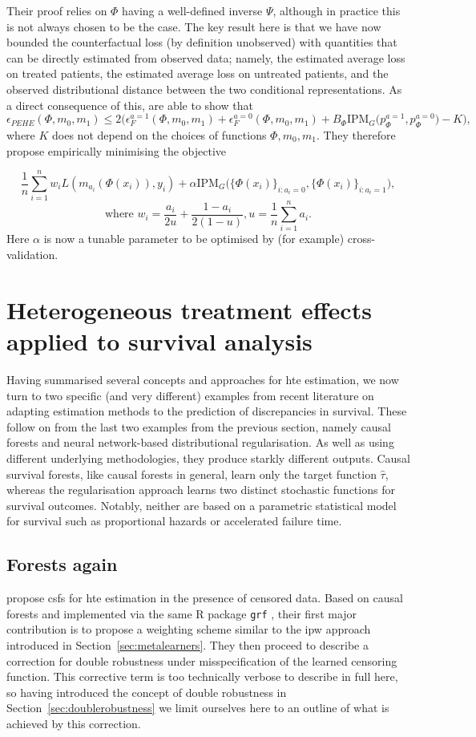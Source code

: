 \documentclass[../thesis.tex]{subfiles}
\begin{document}
Their proof relies on $\Phi$ having a well-defined inverse $\Psi$, although in practice this is not always chosen to be the case. The key result here is that we have now bounded the counterfactual loss (by definition unobserved) with quantities that can be directly estimated from observed data; namely, the estimated average loss on treated patients, the estimated average loss on untreated patients, and the observed distributional distance between the two conditional representations. As a direct consequence of this, \citet{shalit_estimating_2017} are able to show that 
\[ \epsilon_{PEHE}(\Phi, m_0, m_1) \leq 2\Big(\epsilon_{F}^{a=1}(\Phi, m_0, m_1) + \epsilon^{a=0}_F(\Phi, m_0, m_1) + B_{\Phi}\mathrm{IPM}_G\big(p_\Phi^{a=1}, p_\Phi^{a=0}\big) - K\Big),\]
where $K$ does not depend on the choices of functions $\Phi, m_0, m_1$. They therefore propose empirically minimising the objective

\[\frac{1}{n}\sum_{i=1}^n w_i L(m_{a_i}(\Phi(x_i)), y_i) + \alpha \mathrm{IPM}_G\big(\{\Phi(x_i)\}_{i:a_i=0}, \{\Phi(x_i)\}_{i:a_i=1}\big),\]
\[ \text{where } w_i = \frac{a_i}{2u} + \frac{1-a_i}{2(1-u)}, u = \frac{1}{n}\sum_{i=1}^{n}a_i.\]
Here $\alpha$ is now a tunable parameter to be optimised by (for example) cross-validation.


\section{Heterogeneous treatment effects applied to survival analysis \label{sec:hte_survival}}
Having summarised several concepts and approaches for \gls{hte} estimation, we now turn to two specific (and very different) examples from recent literature on adapting estimation methods to the prediction of discrepancies in survival. These follow on from the last two examples from the previous section, namely causal forests and neural network-based distributional regularisation. As well as using different underlying methodologies, they produce starkly different outputs. Causal survival forests, like causal forests in general, learn only the target function $\hat{\tau}$, whereas the regularisation approach learns two distinct stochastic functions for survival outcomes. Notably, neither are based on a parametric statistical model for survival such as proportional hazards or accelerated failure time.

\subsection{Forests again \label{sec:surv_hte_forests}}
\citet{cui_estimating_2022} propose \glspl{csf} for \gls{hte} estimation in the presence of censored data. Based on causal forests and implemented via the same R package \texttt{grf} \citep{tibshirani_grf_2023}, their first major contribution is to propose a weighting scheme similar to the \gls{ipw} approach introduced in Section~\ref{sec:metalearners}. They then proceed to describe a correction for double robustness under misspecification of the learned censoring function. This corrective term is too technically verbose to describe in full here, so having introduced the concept of double robustness in Section~\ref{sec:doublerobustness} we limit ourselves here to an outline of what is achieved by this correction.
\end{document}
